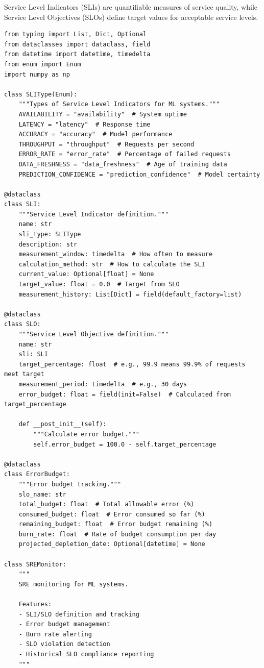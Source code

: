 Service Level Indicators (SLIs) are quantifiable measures of service quality, while Service Level Objectives (SLOs) define target values for acceptable service levels.

\begin{lstlisting}[style=python, caption={SLIs and SLOs for ML systems}]
from typing import List, Dict, Optional
from dataclasses import dataclass, field
from datetime import datetime, timedelta
from enum import Enum
import numpy as np

class SLIType(Enum):
    """Types of Service Level Indicators for ML systems."""
    AVAILABILITY = "availability"  # System uptime
    LATENCY = "latency"  # Response time
    ACCURACY = "accuracy"  # Model performance
    THROUGHPUT = "throughput"  # Requests per second
    ERROR_RATE = "error_rate"  # Percentage of failed requests
    DATA_FRESHNESS = "data_freshness"  # Age of training data
    PREDICTION_CONFIDENCE = "prediction_confidence"  # Model certainty

@dataclass
class SLI:
    """Service Level Indicator definition."""
    name: str
    sli_type: SLIType
    description: str
    measurement_window: timedelta  # How often to measure
    calculation_method: str  # How to calculate the SLI
    current_value: Optional[float] = None
    target_value: float = 0.0  # Target from SLO
    measurement_history: List[Dict] = field(default_factory=list)

@dataclass
class SLO:
    """Service Level Objective definition."""
    name: str
    sli: SLI
    target_percentage: float  # e.g., 99.9 means 99.9% of requests meet target
    measurement_period: timedelta  # e.g., 30 days
    error_budget: float = field(init=False)  # Calculated from target_percentage

    def __post_init__(self):
        """Calculate error budget."""
        self.error_budget = 100.0 - self.target_percentage

@dataclass
class ErrorBudget:
    """Error budget tracking."""
    slo_name: str
    total_budget: float  # Total allowable error (%)
    consumed_budget: float  # Error consumed so far (%)
    remaining_budget: float  # Error budget remaining (%)
    burn_rate: float  # Rate of budget consumption per day
    projected_depletion_date: Optional[datetime] = None

class SREMonitor:
    """
    SRE monitoring for ML systems.

    Features:
    - SLI/SLO definition and tracking
    - Error budget management
    - Burn rate alerting
    - SLO violation detection
    - Historical SLO compliance reporting
    """


\end{lstlisting}
